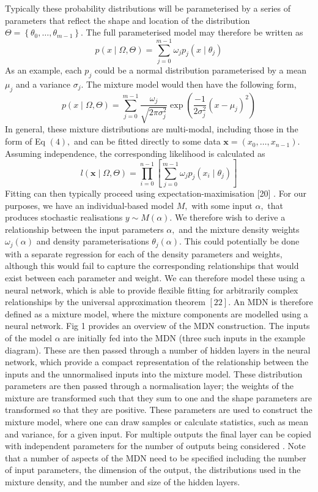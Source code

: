 Typically these probability distributions will be parameterised by a series of parameters that reflect the shape and location of the distribution $\Theta=\left\{\theta_{0}, \ldots, \theta_{m-1}\right\} .$ The full parameterised model may therefore be written as
\[
p(x \mid \Omega, \Theta)=\sum_{j=0}^{m-1} \omega_{j} p_{j}\left(x \mid \theta_{j}\right)
\]
As an example, each $p_{j}$ could be a normal distribution parameterised by a mean $\mu_{j}$ and a variance $\sigma_{j}$. The mixture model would then have the following form,
\[
p(x \mid \Omega, \Theta)=\sum_{j=0}^{m-1} \frac{\omega_{j}}{\sqrt{2 \pi \sigma_{j}^{2}}} \exp \left(\frac{-1}{2 \sigma_{j}^{2}}\left(x-\mu_{j}\right)^{2}\right)
\]
In general, these mixture distributions are multi-modal, including those in the form of Eq
$(4),$ and can be fitted directly to some data $\mathbf{x}=\left(x_{0}, \ldots, x_{n-1}\right) .$ Assuming independence, the corresponding likelihood is calculated as
\[
l(\mathbf{x} \mid \Omega, \Theta)=\prod_{i=0}^{n-1}\left[\sum_{j=0}^{m-1} \omega_{j} p_{j}\left(x_{i} \mid \theta_{j}\right)\right]
\]
Fitting can then typically proceed using expectation-maximisation [20] . For our purposes, we have an individual-based model $M,$ with some input $\alpha,$ that produces stochastic realisations $y \sim M(\alpha) .$ We therefore wish to derive a relationship between the input parameters $\alpha,$ and the mixture density weights $\omega_{j}(\alpha)$ and density parameterisations $\theta_{j}(\alpha) .$ This could potentially be done with a separate regression for each of the density parameters and weights, although this would fail to capture the corresponding relationships that would exist between each parameter and weight. We can therefore model these using a neural network, which is able to provide flexible fitting for arbitrarily complex relationships by the universal approximation theorem
$[22] .$ An MDN is therefore defined as a mixture model, where the mixture components are modelled using a neural network. Fig 1 provides an overview of the MDN construction. The inputs of the model $\alpha$ are initially fed into the MDN (three such inputs in the example diagram). These are then passed through a number of hidden layers in the neural network, which provide a compact representation of the relationship between the inputs and the unnormalised inputs into the mixture model. These distribution parameters are then passed through a normalisation layer; the weights of the mixture are transformed such that they sum to one and the shape parameters are transformed so that they are positive. These parameters are used to construct the mixture model, where one can draw samples or calculate statistics, such as mean and variance, for a given input. For multiple outputs the final layer can be copied with independent parameters for the number of outputs being considered . Note that a number of aspects of the MDN need to be specified including the number of input parameters, the dimension of the output, the distributions used in the mixture density, and the number and size of the hidden layers.
